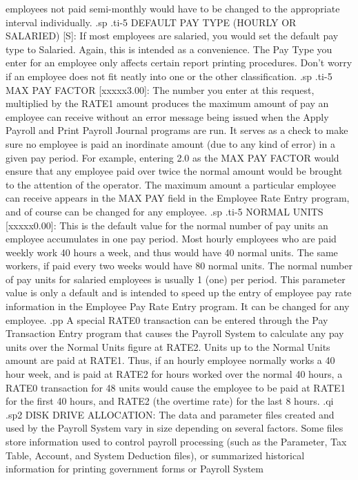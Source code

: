 employees not paid semi-monthly would have to be changed to the appropriate
interval individually.
.sp
.ti-5
DEFAULT PAY TYPE (HOURLY OR SALARIED) [S]: If most employees are salaried,
you would set the default pay type to Salaried.  Again, this is intended
as a convenience.  The Pay Type you enter for an employee only affects
certain report printing procedures.  Don't worry if an employee does not
fit neatly into one or the other classification.
.sp
.ti-5
MAX PAY FACTOR [xxxxx3.00]: The number you enter at this request, multiplied
by the RATE1 amount produces the maximum amount of pay an employee can
receive without an error message being issued when the Apply Payroll and
Print Payroll Journal programs are run.
It serves as a check to make sure no employee is paid an
inordinate amount (due to any kind of error) in a given pay period.  For
example, entering 2.0 as the MAX PAY FACTOR would ensure that any employee
paid over twice the normal amount would be brought to the attention of the
operator.
The maximum amount a particular employee can receive appears in the MAX PAY
field in the Employee Rate Entry program, and of course can be changed
for any employee.
.sp
.ti-5
NORMAL UNITS [xxxxx0.00]: This is the default value for the normal number of
pay units an employee accumulates in one pay period.  Most hourly employees
who are paid weekly work 40 hours a week, and thus would have 40 normal
units.	The same workers, if paid every two weeks would have 80 normal
units.	The normal number of pay units for salaried employees is usually 1
(one) per period.  This parameter value is only a default and is intended
to speed up the entry of employee pay rate information in the Employee Pay
Rate Entry program.  It can be changed for any employee.
.pp
A special RATE0 transaction can be entered through the Pay Transaction
Entry program that causes the Payroll System to calculate any pay units
over the Normal Units figure at RATE2.	Units up to the Normal Units amount
are paid at RATE1.  Thus, if an hourly employee normally works a 40 hour
week, and is paid at RATE2 for hours worked over the normal 40 hours,
a RATE0 transaction for 48 units would cause the employee to be
paid at RATE1 for the first 40 hours, and RATE2 (the overtime rate) for
the last 8 hours.
.qi
.sp2
DISK DRIVE ALLOCATION: The data and parameter files created and used by
the Payroll System vary in size depending on several factors.  Some files
store information used to control payroll processing (such as the Parameter,
Tax Table, Account, and System Deduction files), or summarized
historical information for printing government forms or Payroll System

